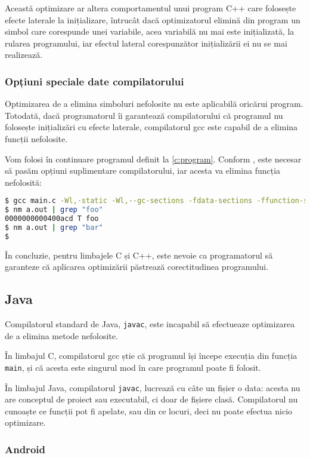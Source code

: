 Această optimizare ar altera comportamentul unui program C++ care
folosește efecte laterale la inițializare, întrucât dacă
optimizatorul elimină din program un simbol care corespunde unei
variabile, acea variabilă nu mai este inițializată, la rularea
programului, iar efectul lateral corespunzător inițializării ei
nu se mai realizează.

\subsubsection{Opțiuni speciale date compilatorului}

Optimizarea de a elimina simboluri nefolosite nu este aplicabilă
oricărui program. Totodată, dacă programatorul îi garantează
compilatorului că programul nu folosește inițializări cu efecte
laterale, compilatorul gcc este capabil de a elimina funcții
nefolosite.

Vom folosi în continuare programul definit la \ref{c:program}.
Conform \cite{c_enable_optimization}, este necesar să pasăm
opțiuni suplimentare compilatorului, iar acesta va elimina
funcția nefolosită:

\begin{lstlisting}[language=Bash]
$ gcc main.c -Wl,-static -Wl,--gc-sections -fdata-sections -ffunction-sections -Os
$ nm a.out | grep "foo"
0000000000400acd T foo
$ nm a.out | grep "bar"
$
\end{lstlisting}

În concluzie, pentru limbajele C și C++, este nevoie ca
programatorul să garanteze că aplicarea optimizării păstrează
corectitudinea programului.

\subsection{Java}

Compilatorul standard de Java, \texttt{javac}, este incapabil să
efectueaze optimizarea de a elimina metode nefolosite.

În limbajul C, compilatorul gcc știe că programul își începe
execuția din funcția \texttt{main}, și că acesta este singurul
mod în care programul poate fi folosit.

În limbajul Java, compilatorul \texttt{javac}, lucrează cu câte
un fișier o data: acesta nu are conceptul de proiect sau
executabil, ci doar de fișiere clasă.
Compilatorul nu cunoaște ce funcții pot fi apelate, sau
din ce locuri, deci nu poate efectua nicio optimizare.

\subsubsection{Android}


